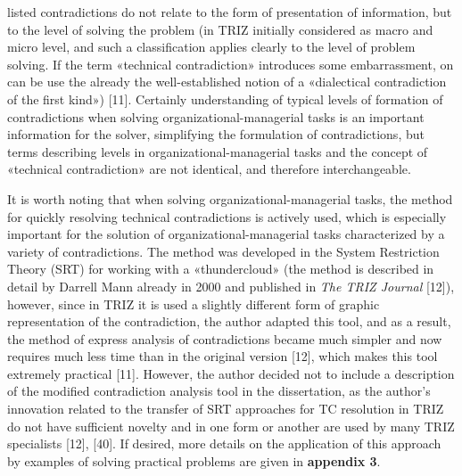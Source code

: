 \documentclass[11pt,a4paper]{book}
\begin{document}
listed contradictions do not relate to the form of presentation of
information, but to the level of solving the problem (in TRIZ initially
considered as macro and micro level, and such a classification applies clearly
to the level of problem solving. If the term «technical contradiction»
introduces some embarrassment, on can be use the already the well-established
notion of a «dialectical contradiction of the first kind») [11]. Certainly
understanding of typical levels of formation of contradictions when solving
organizational-managerial tasks is an important information for the solver,
simplifying the formulation of contradictions, but terms describing levels in
organizational-managerial tasks and the concept of «technical contradiction»
are not identical, and therefore interchangeable.

It is worth noting that when solving organizational-managerial tasks, the
method for quickly resolving technical contradictions is actively used, which
is especially important for the solution of organizational-managerial tasks
characterized by a variety of contradictions. The method was developed in the
System Restriction Theory (SRT) for working with a «thundercloud» (the method
is described in detail by Darrell Mann already in 2000 and published in
\emph{The TRIZ Journal} [12]), however, since in TRIZ it is used a slightly
different form of graphic representation of the contradiction, the author
adapted this tool, and as a result, the method of express analysis of
contradictions became much simpler and now requires much less time than in the
original version [12], which makes this tool extremely practical [11].
However, the author decided not to include a description of the modified
contradiction analysis tool in the dissertation, as the author’s innovation
related to the transfer of SRT approaches for TC resolution in TRIZ do not
have sufficient novelty and in one form or another are used by many TRIZ
specialists [12], [40]. If desired, more details on the application of this
approach by examples of solving practical problems are given in
\textbf{appendix 3}.
\end{document}
